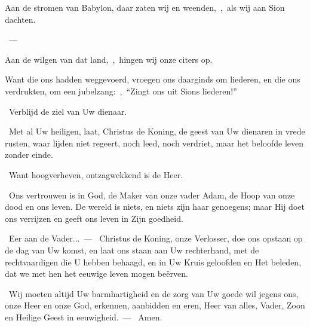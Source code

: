 \documentclass[12pt,twoside,a5paper]{article}
\begin{document}

\begin{halfparskip}
  Aan de stromen van Babylon, daar zaten wij en weenden,~\sep\ als wij aan Sion dachten.

  ~--- 

  Aan de wilgen van dat land,~\sep\ hingen wij onze citers op.

  Want die ons hadden weggevoerd, vroegen ons daarginds om liederen, en die ons verdrukten, om een jubelzang:~\sep\ ``Zingt ons uit Sions liederen!''
\end{halfparskip}

 



\begin{halfparskip}
  \dd~Verblijd de ziel van Uw dienaar.

  \rr~Met al Uw heiligen, laat, Christus de Koning, de geest van Uw dienaren in vrede rusten, waar lijden niet regeert, noch leed, noch verdriet, maar het beloofde leven zonder einde.

  \dd~Want hoogverheven, ontzagwekkend is de Heer.

  \rr~Ons vertrouwen is in God, de Maker van onze vader Adam, de Hoop van onze dood en ons leven. De wereld is niets, en niets zijn haar genoegens; maar Hij doet ons verrijzen en geeft ons leven in Zijn goedheid.

  \cc~Eer aan de Vader...~--- \rr~Christus de Koning, onze Verlosser, doe ons opstaan op de dag van Uw komst, en laat ons staan aan Uw rechterhand, met de rechtvaardigen die U hebben behaagd, en in Uw Kruis geloofden en Het beleden, dat we met hen het eeuwige leven mogen beërven.

  \liturgicalhint{*} \cc~Wij moeten altijd Uw barmhartigheid en de zorg van Uw goede wil jegens ons, onze Heer en onze God, erkennen, aanbidden en eren, Heer van alles, Vader, Zoon en Heilige Geest in eeuwigheid.~--- \rr~Amen.
\end{halfparskip}


\end{document}
